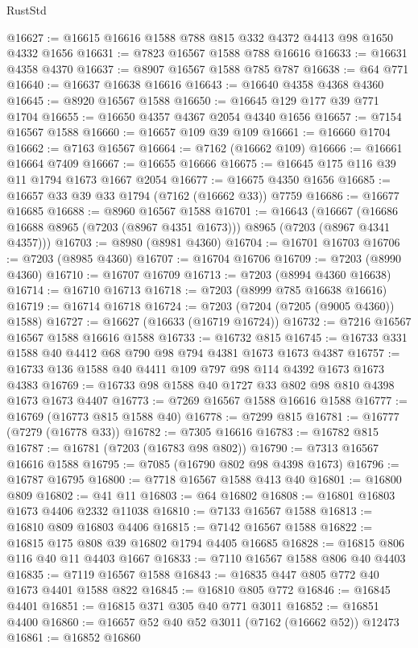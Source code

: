 \begin{lexlean}{RustStd}
\begin{coremodule}
@16627 := @16615 @16616 @1588 @788 @815 @332 @4372 @4413 @98 @1650 @4332 @1656
@16631 := @7823 @16567 @1588 @788 @16616
@16633 := @16631 @4358 @4370
@16637 := @8907 @16567 @1588 @785 @787
@16638 := @64 @771
@16640 := @16637 @16638 @16616
@16643 := @16640 @4358 @4368 @4360
@16645 := @8920 @16567 @1588
@16650 := @16645 @129 @177 @39 @771 @1704
@16655 := @16650 @4357 @4367 @2054 @4340 @1656
@16657 := @7154 @16567 @1588
@16660 := @16657 @109 @39 @109
@16661 := @16660 @1704
@16662 := @7163 @16567
@16664 := @7162 (@16662 @109)
@16666 := @16661 @16664 @7409
@16667 := @16655 @16666
@16675 := @16645 @175 @116 @39 @11 @1794 @1673 @1667 @2054
@16677 := @16675 @4350 @1656
@16685 := @16657 @33 @39 @33 @1794 (@7162 (@16662 @33)) @7759
@16686 := @16677 @16685
@16688 := @8960 @16567 @1588
@16701 := @16643
    (@16667 (@16686 @16688 @8965 (@7203 (@8967 @4351 @1673))) @8965 (@7203 (@8967 @4341 @4357)))
@16703 := @8980 (@8981 @4360)
@16704 := @16701 @16703
@16706 := @7203 (@8985 @4360)
@16707 := @16704 @16706
@16709 := @7203 (@8990 @4360)
@16710 := @16707 @16709
@16713 := @7203 (@8994 @4360 @16638)
@16714 := @16710 @16713
@16718 := @7203 (@8999 @785 @16638 @16616)
@16719 := @16714 @16718
@16724 := @7203 (@7204 (@7205 (@9005 @4360)) @1588)
@16727 := @16627 (@16633 (@16719 @16724))
@16732 := @7216 @16567 @16567 @1588 @16616 @1588
@16733 := @16732 @815
@16745 := @16733 @331 @1588 @40 @4412 @68 @790 @98 @794 @4381 @1673 @1673 @4387
@16757 := @16733 @136 @1588 @40 @4411 @109 @797 @98 @114 @4392 @1673 @1673 @4383
@16769 := @16733 @98 @1588 @40 @1727 @33 @802 @98 @810 @4398 @1673 @1673 @4407
@16773 := @7269 @16567 @1588 @16616 @1588
@16777 := @16769 (@16773 @815 @1588 @40)
@16778 := @7299 @815
@16781 := @16777 (@7279 (@16778 @33))
@16782 := @7305 @16616
@16783 := @16782 @815
@16787 := @16781 (@7203 (@16783 @98 @802))
@16790 := @7313 @16567 @16616 @1588
@16795 := @7085 (@16790 @802 @98 @4398 @1673)
@16796 := @16787 @16795
@16800 := @7718 @16567 @1588 @413 @40
@16801 := @16800 @809
@16802 := @41 @11
@16803 := @64 @16802
@16808 := @16801 @16803 @1673 @4406 @2332 @11038
@16810 := @7133 @16567 @1588
@16813 := @16810 @809 @16803 @4406
@16815 := @7142 @16567 @1588
@16822 := @16815 @175 @808 @39 @16802 @1794 @4405 @16685
@16828 := @16815 @806 @116 @40 @11 @4403 @1667
@16833 := @7110 @16567 @1588 @806 @40 @4403
@16835 := @7119 @16567 @1588
@16843 := @16835 @447 @805 @772 @40 @1673 @4401 @1588 @822
@16845 := @16810 @805 @772
@16846 := @16845 @4401
@16851 := @16815 @371 @305 @40 @771 @3011
@16852 := @16851 @4400
@16860 := @16657 @52 @40 @52 @3011 (@7162 (@16662 @52)) @12473
@16861 := @16852 @16860

\end{coremodule}
\end{lexlean}
